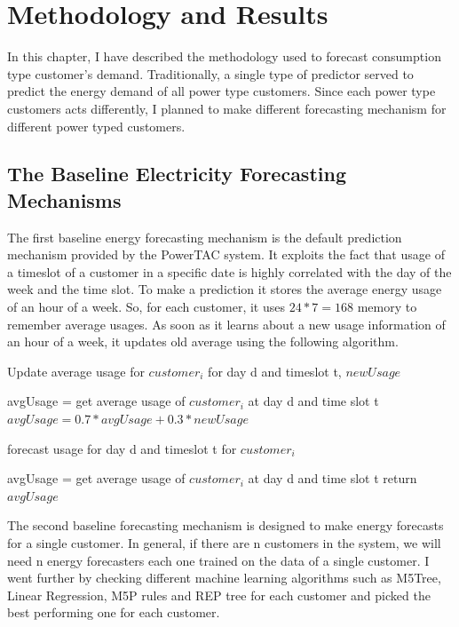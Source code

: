 
\chapter{Methodology and Results}

In this chapter, I have described the methodology used to forecast consumption type customer's demand. Traditionally, a single type of predictor served to predict the energy demand of all power type customers. Since each power type customers acts differently, I planned to make different forecasting mechanism for different power typed customers.

\section{The Baseline Electricity Forecasting Mechanisms}
The first baseline energy forecasting mechanism is the default prediction mechanism provided by the PowerTAC system. It exploits the fact that usage of a timeslot of a customer in a specific date is highly correlated with the day of the week and the time slot. To make a prediction it stores the average energy usage of an hour of a week. So, for each customer, it uses $24*7 = 168$ memory to remember average usages. As soon as it learns about a new usage information of an hour of a week, it updates old average using the following algorithm.


\begin{algorithm}
 
\caption{Update average usage for $customer_i$ for day d and timeslot t, $newUsage$}
\begin{algorithmic} [1]
\STATE avgUsage = get average usage of $customer_i$ at day d and time slot t
\STATE $avgUsage = 0.7 * avgUsage + 0.3 * newUsage$
\end{algorithmic}
\label{alg:updateAvgMovingAvg}
\end{algorithm}

\begin{algorithm}
\caption{forecast usage for day d and timeslot t for $customer_i$}
\begin{algorithmic} [1]
\STATE avgUsage = get average usage of $customer_i$ at day d and time slot t 
\STATE return $avgUsage$
\end{algorithmic}
 \label{alg:predictAvgMovingAvg}
\end{algorithm}

The second baseline forecasting mechanism is designed to make energy forecasts for a single customer. In general, if there are n customers in the system, we will need n energy forecasters each one trained on the data of a single customer. I went further by checking different machine learning algorithms such as M5Tree, Linear Regression, M5P rules and REP tree for each customer and picked the best performing one for each customer.

